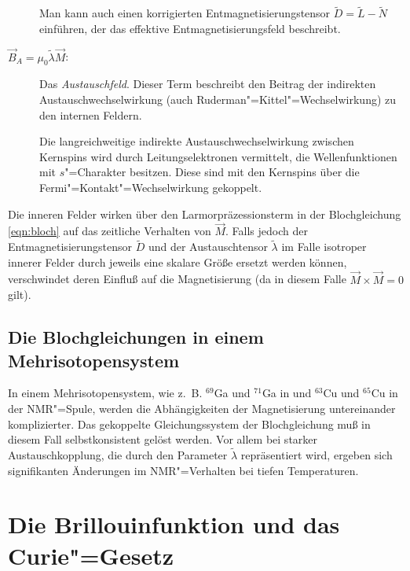\begin{description}
		Man kann auch einen korrigierten Entmagnetisierungstensor $\tilde{D}=\tilde{L}-\tilde{N}$
		einführen, der das effektive Entmagnetisierungsfeld beschreibt.

	\item[$\vec B_A=\mu_0\tilde{\lambda}\vec M$:] Das \emph{Austauschfeld}. Dieser Term beschreibt den
		Beitrag der indirekten Austauschwechselwirkung (auch Ruderman"=Kittel"=Wechselwirkung) zu den
		internen Feldern.

		Die langreichweitige indirekte Austauschwechselwirkung zwischen Kernspins wird durch
		Leitungselektronen vermittelt, die Wellenfunktionen mit $s$"=Charakter besitzen. Diese
		sind mit den Kernspins über die Fermi"=Kontakt"=Wechselwirkung gekoppelt.
\end{description}

Die inneren Felder wirken über den Larmorpräzessionsterm in der Blochgleichung \eqref{eqn:bloch}
auf das zeitliche Verhalten von $\vec M$. Falls jedoch der Entmagnetisierungstensor $\tilde{D}$
und der Austauschtensor $\tilde{\lambda}$ im Falle isotroper innerer Felder durch jeweils eine
skalare Größe ersetzt werden können, verschwindet deren Einfluß auf die Magnetisierung (da in
diesem Falle $\vec M\times\vec M=0$ gilt).

\subsection{Die Blochgleichungen in einem Mehrisotopensystem}

In einem Mehrisotopensystem, wie z.\ B. $^{69}$Ga und $^{71}$Ga in \aug{} und $^{63}$Cu und
$^{65}$Cu in der NMR"=Spule, werden die Abhängigkeiten der Magnetisierung untereinander
komplizierter. Das gekoppelte Gleichungssystem der Blochgleichung muß in diesem Fall
selbstkonsistent gelöst werden. Vor allem bei starker Austauschkopplung, die durch den Parameter
$\tilde{\lambda}$ repräsentiert wird, ergeben sich signifikanten Änderungen im NMR"=Verhalten bei
tiefen Temperaturen.



\section{Die Brillouinfunktion und das Curie"=Gesetz}


